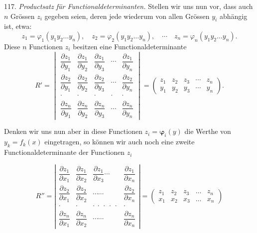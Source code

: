 \documentclass[11pt]{article}
\providecommand{\weberpage}[1]{}
\begin{document}
117. \textit{Productsatz für Functionaldeterminanten.} Stellen wir uns nun vor, dass auch $n$ Grössen $z_i$ gegeben seien, deren jede wiederum von allen Grössen $y_i$ abhängig ist, etwa:
\[
z_1=\varphi_1(y_1y_2\ldots y_n),\quad z_2=\varphi_2(y_1y_2\ldots y_n),\quad\cdots\quad z_n=\varphi_n(y_1y_2\ldots y_n).
\]
Diese $n$ Functionen $z_i$ besitzen eine Functionaldeterminante
\[
R'=\begin{vmatrix}
\dfrac{\partial z_1}{\partial y_1} & \dfrac{\partial z_1}{\partial y_2} & \dfrac{\partial z_1}{\partial y_3} & \cdots & \dfrac{\partial z_1}{\partial y_n}\\[2ex]
\dfrac{\partial z_2}{\partial y_1} & \dfrac{\partial z_2}{\partial y_2} & \dfrac{\partial z_2}{\partial y_3} & \cdots & \dfrac{\partial z_2}{\partial y_n}\\[1.5ex]
\cdot & \cdot & \cdot & \cdot & \cdot\\[1ex]
\dfrac{\partial z_n}{\partial y_1} & \dfrac{\partial z_n}{\partial y_2} & \dfrac{\partial z_n}{\partial y_3} & \cdots & \dfrac{\partial z_n}{\partial y_n}
\end{vmatrix}
=\begin{pmatrix} z_1 & z_2 & z_3 & \cdots & z_n\\ y_1 & y_2 & y_3 & \cdots & y_n \end{pmatrix}.
\]


\weberpage{123}

Denken wir uns nun aber in diese Functionen $z_i = \boldsymbol{\varphi}_i(y)$ die Werthe
von $y_k = f_k(x)$ eingetragen, so können wir auch noch eine zweite
Functionaldeterminante der Functionen $z_i$

\[
R'' = \left|
\begin{array}{cccc}
\dfrac{\partial z_1}{\partial x_1} & \dfrac{\partial z_1}{\partial x_2} & \dfrac{\partial z_1}{\partial x_3} \cdots & \dfrac{\partial z_1}{\partial x_n} \\[2ex]
\dfrac{\partial z_2}{\partial x_1} & \dfrac{\partial z_2}{\partial x_2} & \cdots\cdots & \dfrac{\partial z_2}{\partial x_n} \\[2ex]
\cdot & \cdot & \cdot\ \cdot\ \cdot\ \cdot\ \cdot & \cdot \\[2ex]
\dfrac{\partial z_n}{\partial x_1} & \dfrac{\partial z_n}{\partial x_2} & \cdots\cdots & \dfrac{\partial z_n}{\partial x_n}
\end{array}
\right|
=
\begin{pmatrix} z_1 & z_2 & z_3 & \ldots & z_n \\ x_1 & x_2 & x_3 & \ldots & x_n \end{pmatrix}
\]
\end{document}
